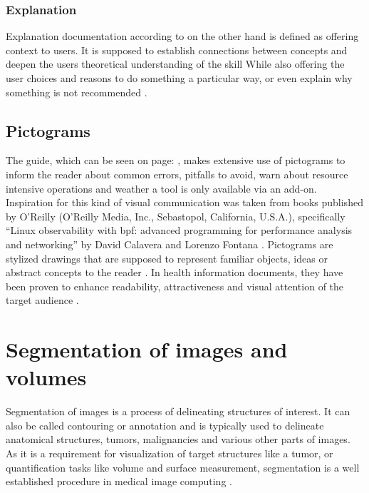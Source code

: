 \subsubsection*{Explanation}
Explanation documentation according to \citeauthor{procidaDiataxisDocumentationFramework2023} on the other hand is defined as offering context to users.
It is supposed to establish connections between concepts and deepen the users theoretical understanding of the skill
While also offering the user choices and reasons to do something a particular way, or even explain why something is not recommended \cite{procidaPythonDocsCommunity2022,procidaDiataxisDocumentationFramework2023}.

\subsection{Pictograms}
\label{s:b-pictograms}
The guide, which can be seen on page: \pageref{a:gSebastopol, Californiauide}, makes extensive use of pictograms to inform the reader about common errors, pitfalls to avoid, warn about resource intensive operations and weather a tool is only available via an add-on.
Inspiration for this kind of visual communication was taken from books published by O'Reilly (O'Reilly Media, Inc., Sebastopol, California, U.S.A.), specifically ``Linux observability with \acrshort{bpf}: advanced programming for performance analysis and networking'' by David Calavera and Lorenzo Fontana \cite{calaveraLinuxObservabilityBPF2019}.
Pictograms are stylized drawings that are supposed to represent familiar objects, ideas or abstract concepts to the reader \cite{dowsePharmacistsAreWords2021}.
In health information documents, they have been proven to enhance readability, attractiveness and visual attention of the target audience \cite{houtsRolePicturesImproving2006,mansoorEffectPictogramsReadability2003}.\\

\section{Segmentation of images and volumes}
\label{s:b-segmentation-basics}
Segmentation of images is a process of delineating structures of interest.
It can also be called contouring or annotation and is typically used to delineate anatomical structures, tumors, 
malignancies and various other parts of images.
As it is a requirement for visualization of target structures like a tumor, or quantification tasks like volume and surface measurement,
segmentation is a well established procedure in medical image computing \cite{pinterPolymorphSegmentationRepresentation2019,slicercommunity3DSlicerImage2022}.

